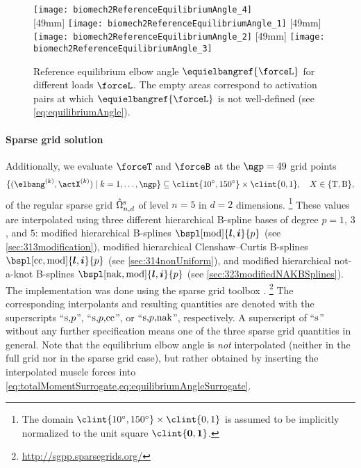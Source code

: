 \begin{figure}
  \texttt{[image: biomech2ReferenceEquilibriumAngle\_4]}%
  \\[2mm]%
  [49mm]{%
    \texttt{[image: biomech2ReferenceEquilibriumAngle\_1]}%
  }%
  \hfill%
  [49mm]{%
    \texttt{[image: biomech2ReferenceEquilibriumAngle\_2]}%
  }%
  \hfill%
  [49mm]{%
    \texttt{[image: biomech2ReferenceEquilibriumAngle\_3]}%
  }%
  \caption[Reference equilibrium elbow angle]{%
    Reference equilibrium elbow angle $\equielbangref{\forceL}$
    for different loads $\forceL$.
    The empty areas correspond to activation pairs
    at which $\equielbangref{\forceL}$ is not well-defined
    (see \cref{eq:equilibriumAngle}).%
  }%
  \label{fig:biomech2ReferenceEquilibriumAngle}%
\end{figure}

\paragraph{Sparse grid solution}

Additionally, we evaluate $\forceT$ and $\forceB$ at the $\ngp = 49$
grid points
\begin{equation}
  \{(\elbang^{(k)}, \actX^{(k)}) \mid k = 1, \dotsc, \ngp\}
  \subset \clint{\ang{10}, \ang{150}} \times \clint{0, 1},\quad
  X \in \{\mathrm{T}, \mathrm{B}\},
\end{equation}
of the regular sparse grid $\interiorregsgset{n}{d}$ of
level $n = 5$ in $d = 2$ dimensions.%
\footnote{%
  The domain $\clint{\ang{10}, \ang{150}} \times \clint{0, 1}$
  is assumed to be implicitly normalized to the unit square
  $\clint{\*0, \*1}$.%
}
These values are interpolated using three
different hierarchical B-spline bases of degree $p = 1$, $3$, and $5$:
modified hierarchical B-splines
$\bspl[\modified]{\*l,\*i}{p}$
(see \cref{sec:313modification}),
modified hierarchical Clenshaw--Curtis B-splines
$\bspl[\cc,\modified]{\*l,\*i}{p}$
(see \cref{sec:314nonUniform}), and
modified hierarchical not-a-knot B-splines
$\bspl[\nak,\modified]{\*l,\*i}{p}$
(see \cref{sec:323modifiedNAKBSplines}).
The implementation was done using the sparse grid toolbox
\sgpp{} \cite{Pflueger10Spatially}.%
\footnote{%
  \url{http://sgpp.sparsegrids.org/}%
}
The corresponding interpolants and resulting quantities
are denoted with the superscripts
``$\mathrm{s},\!p$'', ``$\mathrm{s},\!p,\!\mathrm{cc}$'', or ``$\mathrm{s},\!p,\!\mathrm{nak}$'',
respectively.
A superscript of ``$\mathrm{s}$'' without any further specification
means one of the three sparse grid quantities in general.
Note that the equilibrium elbow angle is \emph{not} interpolated
(neither in the full grid nor in the sparse grid case),
but rather obtained by inserting the interpolated muscle forces
into \cref{eq:totalMomentSurrogate,eq:equilibriumAngleSurrogate}.



